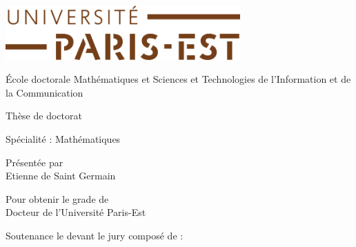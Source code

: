 

\thispagestyle{empty}
\begin{center}
\includegraphics[width=9cm]{head/logo_upe.png}


\vspace*{0.5cm}

{\large \'Ecole doctorale {\sc Math\'ematiques et Sciences et Technologies de l'Information et de la Communication}}

\vspace*{1cm}

{\huge {\sc Th\`ese de doctorat}}

\vspace*{0.5cm}

{\large Sp\'ecialit\'e : Math\'ematiques}

\vspace*{1cm}

{\large Pr\'esent\'ee par}\ \\[1ex]

{\huge {Etienne \sc de Saint Germain}}

\vspace*{1cm}

{\large Pour obtenir le grade de \ \\[1ex]
{\sc Docteur de l'Universit\'e Paris-Est}}

\vspace*{1.2cm}

{\Huge {}}

\vspace*{0.3cm}

{\Huge {}}

\vspace*{0.5cm}

{\large {}}

\vspace*{1.5cm}

{\Large Soutenance le  devant le jury compos\'e de :}

\end{center}

